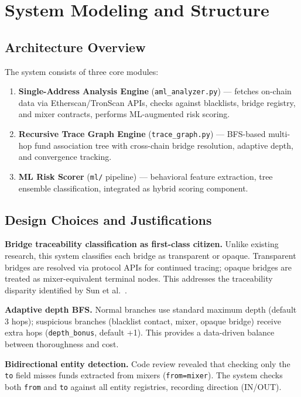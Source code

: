 \documentclass[12pt,a4paper]{article}
\begin{document}
\section{System Modeling and Structure}

\subsection{Architecture Overview}

The system consists of three core modules:
\begin{enumerate}
    \item \textbf{Single-Address Analysis Engine} (\texttt{aml\_analyzer.py}) --- fetches on-chain data via Etherscan/TronScan APIs, checks against blacklists, bridge registry, and mixer contracts, performs ML-augmented risk scoring.
    \item \textbf{Recursive Trace Graph Engine} (\texttt{trace\_graph.py}) --- BFS-based multi-hop fund association tree with cross-chain bridge resolution, adaptive depth, and convergence tracking.
    \item \textbf{ML Risk Scorer} (\texttt{ml/} pipeline) --- behavioral feature extraction, tree ensemble classification, integrated as hybrid scoring component.
\end{enumerate}

\subsection{Design Choices and Justifications}

\textbf{Bridge traceability classification as first-class citizen.} Unlike existing research, this system classifies each bridge as transparent or opaque. Transparent bridges are resolved via protocol APIs for continued tracing; opaque bridges are treated as mixer-equivalent terminal nodes. This addresses the traceability disparity identified by Sun et al.~\cite{sun2025track}.

\textbf{Adaptive depth BFS.} Normal branches use standard maximum depth (default 3 hops); suspicious branches (blacklist contact, mixer, opaque bridge) receive extra hops (\texttt{depth\_bonus}, default +1). This provides a data-driven balance between thoroughness and cost.

\textbf{Bidirectional entity detection.} Code review revealed that checking only the \texttt{to} field misses funds extracted from mixers (\texttt{from=mixer}). The system checks both \texttt{from} and \texttt{to} against all entity registries, recording direction (IN/OUT).
\end{document}
